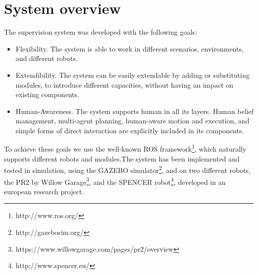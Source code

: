 \section{System overview}
\label{intro-system_overview}
The supervision system was developed with the following goals:
\begin{itemize}
\item Flexibility. The system is able to work in different scenarios, environments, and different robots.
\item Extendibility. The system can be easily extendable by adding or substituting modules, to introduce different capacities, without having an impact on existing components.
\item Human-Awareness. The system supports human in all its layers. Human belief management, multi-agent planning, human-aware motion and execution, and simple forms of direct interaction are explicitly included in its components.
\end{itemize}

To achieve these goals we use the well-known ROS framework\footnote{http://www.ros.org/}, which naturally supports different robots and modules.The system has been implemented and tested in simulation, using the GAZEBO simulator\footnote{http://gazebosim.org/}, and on two different robots, the PR2 by Willow Garage\footnote{https://www.willowgarage.com/pages/pr2/overview}, and the SPENCER robot\footnote{http://www.spencer.eu/}, developed in an european research project. 

